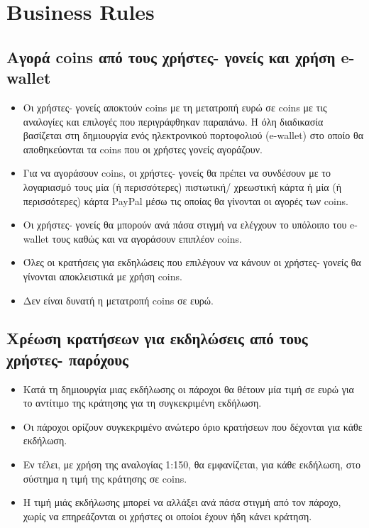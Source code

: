 \documentclass[letterpaper,6pt]{article}
\begin{document}
  \section{Business Rules}

\subsection{Αγορά coins από τους χρήστες- γονείς και χρήση e-wallet}
\begin{itemize}
  \item Οι χρήστες- γονείς αποκτούν coins με τη μετατροπή ευρώ σε coins με τις αναλογίες και επιλογές που περιγράφθηκαν παραπάνω. Η όλη διαδικασία βασίζεται στη δημιουργία ενός ηλεκτρονικού πορτοφολιού (e-wallet) στο οποίο θα αποθηκεύονται τα coins που οι χρήστες γονείς αγοράζουν.
  \item Για να αγοράσουν coins, οι χρήστες- γονείς θα πρέπει να συνδέσουν με το λογαριασμό τους μία (ή περισσότερες) πιστωτική/ χρεωστική κάρτα ή μία (ή περισσότερες) κάρτα PayPal μέσω τις οποίας θα γίνονται οι αγορές των coins.
  \item Οι χρήστες- γονείς θα μπορούν ανά πάσα στιγμή να ελέγχουν το υπόλοιπο του e-wallet τους καθώς και να αγοράσουν επιπλέον coins.
  \item Όλες οι κρατήσεις για εκδηλώσεις που επιλέγουν να κάνουν οι χρήστες-  γονείς θα γίνονται αποκλειστικά με χρήση coins.
  \item Δεν είναι δυνατή η μετατροπή coins σε ευρώ.
\end{itemize}

\subsection{Χρέωση κρατήσεων για εκδηλώσεις από τους χρήστες- παρόχους}
\begin{itemize}
  \item Κατά τη δημιουργία μιας εκδήλωσης οι πάροχοι θα θέτουν μία τιμή σε ευρώ για το αντίτιμο της κράτησης για τη συγκεκριμένη εκδήλωση.
  \item Οι πάροχοι ορίζουν συγκεκριμένο ανώτερο όριο κρατήσεων που δέχονται για κάθε εκδήλωση.
  \item Εν τέλει, με χρήση της αναλογίας 1:150, θα εμφανίζεται, για κάθε εκδήλωση, στο σύστημα η τιμή της κράτησης σε coins.
  \item Η τιμή μιάς εκδήλωσης μπορεί να αλλάξει ανά πάσα στιγμή από τον πάροχο, χωρίς να επηρεάζονται οι χρήστες οι οποίοι έχουν ήδη κάνει κράτηση.
\end{itemize}
\end{document}
